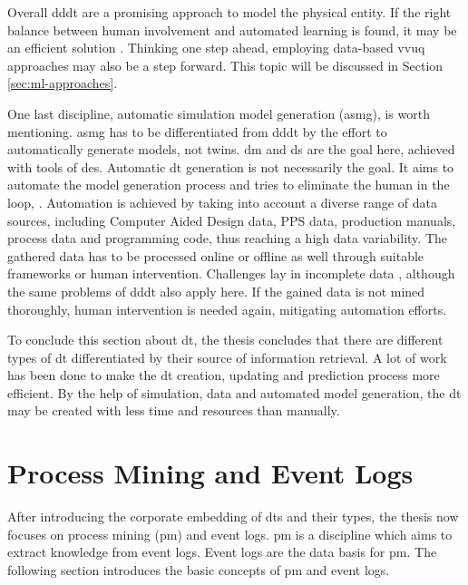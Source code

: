 Overall \gls{dddt} are a promising approach to model the physical entity. If the right balance between human involvement and automated learning is found, it may be an efficient solution \autocite{francis2021towards}. Thinking one step ahead, employing data-based \gls{vvuq} approaches may also be a step forward. This topic will be discussed in Section \autoref{sec:ml-approaches}.

\label{par:asmg}
One last discipline, automatic simulation model generation (\gls{asmg}), is worth mentioning. \gls{asmg} has to be differentiated from \gls{dddt} by the effort to automatically generate models, not twins. \gls{dm} and \gls{ds} are the goal here, achieved with tools of \gls{des}. Automatic \gls{dt} generation is not necessarily the goal. It aims to automate the model generation process and tries to eliminate the human in the loop, \autocite{reinhardt2019survey,lechevalier2018methodology}. Automation is achieved by taking into account a diverse range of data sources, including Computer Aided Design data, PPS data, production manuals, process data and programming code, thus reaching a high data variability. The gathered data has to be processed online or offline as well through suitable frameworks or human intervention. Challenges lay in incomplete data \autocite{bergmann2014automatische}, although the same problems of \gls{dddt} also apply here. If the gained data is not mined thoroughly, human intervention is needed again, mitigating automation efforts.

To conclude this section about \gls{dt}, the thesis concludes that there are different types of \gls{dt} differentiated by their source of information retrieval. A lot of work has been done to make the \gls{dt} creation, updating and prediction process more efficient. By the help of simulation, data and automated model generation, the \gls{dt} may be created with less time and resources than manually.

\section{Process Mining and Event Logs}
\label{sec:process-mining}
After introducing the corporate embedding of \gls{dt}s and their types, the thesis now focuses on process mining (\gls{pm}) and event logs. \gls{pm} is a discipline which aims to extract knowledge from event logs. Event logs are the data basis for \gls{pm}. The following section introduces the basic concepts of \gls{pm} and event logs.

